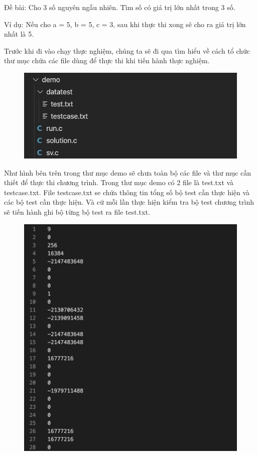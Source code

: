 \documentclass[12pt,a4paper]{article}
\begin{document}
Đề bài: Cho 3 số nguyên ngẫu nhiên. Tìm số có giá trị lớn nhất trong 3 số.

Ví dụ: Nếu cho a = 5, b = 5, c = 3, sau khi thực thi xong sẽ cho ra giá trị lớn nhất là 5.

Trước khi đi vào chạy thực nghiệm, chúng ta sẽ đi qua tìm hiểu về cách tổ chức thư mục chứa các file dùng để thực thi khi tiến hành thực nghiệm.

\begin{figure}[ht]
\begin{center}
\includegraphics[scale=.3]{hinhanh/cautrucfolder.png}
\end{center}
\end{figure}

Như hình bên trên trong thư mục demo sẽ chưa toàn bộ các file và thư mục cần thiết để thực thi chương trình. Trong thư mục demo có 2 file là test.txt và testcase.txt. File testcase.txt se chứa thông tin tổng số bộ test cần thực hiện và các bộ test cần thực hiện. Và cứ mỗi lần thực hiện kiểm tra bộ test chương trình sẽ tiến hành ghi bộ từng bộ test ra file test.txt.

\begin{figure}[ht]
\begin{center}
\includegraphics[scale=.3]{hinhanh/testcase.png}
\end{center}
\end{figure}
\end{document}
